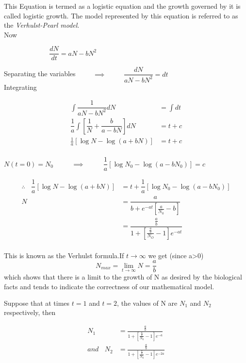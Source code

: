 This Equation is termed as a logistic equation and the growth governed by it is called logistic growth. The model represented by this equation is referred to as the \textit{Verhulst-Pearl model}.
\\Now
\begin{center}
	~~~~~~~~  ~~~~	$ \dfrac{dN}{dt}=aN-bN^{2} $
\end{center} 

Separating the variables $~~~~~~~~~~\implies$ 
$ ~~~~~~~~~~\dfrac{dN}{aN-bN^{2}}=dt $ \\

Integrating 
\begin{center}
	\begin{eqnarray*}
		\int\dfrac{1}{aN-bN^{2}}dN&=\int dt \\
		\dfrac{1}{a}\int[\dfrac{1}{N}+\dfrac{b}{a-bN}]dN&=t+c \\
		\frac{1}{a}[\log N-\log(a+bN)]&=t+c \\
	\end{eqnarray*}
\end{center}

$N(t=0)=N_{0}$ ~~~~ $\implies$  ~~~~
$\dfrac{1}{a}[\log N_{0}-\log(a-bN_{0})]=c$
 \begin{center}
	\begin{eqnarray*}
		\therefore ~~~~   
		\dfrac{1}{a}[\log N-\log(a+bN)]&=t+\dfrac{1}{a}[\log N_{0}-\log(a-bN_{0})] \\
		N&=\dfrac{a}{b+e^{-at}[\frac{a}{N_{0}}-b]} \\
		&=\dfrac{\frac{a}{b}}{1+[\frac{\frac{a}{b}}{N_{O}}-1]e^{-at}} \\
	\end{eqnarray*}
\end{center}
\par This is known as the Verhulst formula.If $t\rightarrow \infty$ we get  (since  a>0) $$N_{max}=\lim_{t\rightarrow \infty}N=\frac{a}{b}$$      which shows that there is a limit to the growth of N as desired by the biological facts and tends to indicate the correctness of our mathematical model.

Suppose that at times $t=1$ and $t=2$, the values of N are $N_{1}$ and $N_{2}$ respectively, then
\begin{center}
	\begin{eqnarray*}
			N_{1}&=\frac{\frac{a}{b}}{1+[\frac{\frac{a}{b}}{N_{0}}-1]e^{-a}}  \\
			and~~~~ 
			N_{2}&=\frac{\frac{a}{b}}{1+[\frac{\frac{a}{b}}{N_{0}}-1]e^{-2a}}
	\end{eqnarray*}
\end{center}
 
